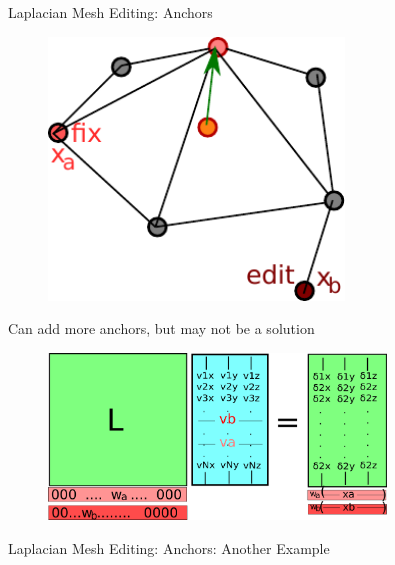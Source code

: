 \documentclass{beamer}
\begin{document}
\begin{frame}{Laplacian Mesh Editing: Anchors}

\begin{minipage}{0.45\textwidth}{
\begin{figure}[t]
    \includegraphics[width=0.7\textwidth]{2DDiscreteCurvatureAnchor2.pdf}
\end{figure}
}
\end{minipage}
\begin{minipage}{0.45\textwidth}
Can add more anchors, but may not be a solution
\end{minipage}

\begin{figure}[t]
    \includegraphics[width=0.8\textwidth]{LaplacianReconstruction2Anchor.pdf}
\end{figure}

\end{frame}

\begin{frame}{Laplacian Mesh Editing: Anchors: Another Example}


\end{frame}
\end{document}
